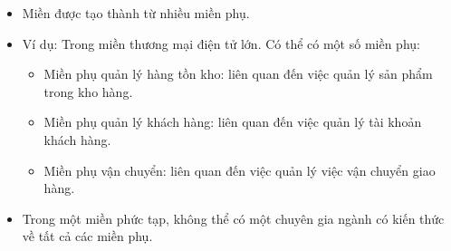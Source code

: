 \begin{itemize}

\item Miền được tạo thành từ nhiều miền phụ.

\item Ví dụ: Trong miền thương mại điện tử lớn. Có thể có một số miền phụ:

\begin{itemize}

\item Miền phụ quản lý hàng tồn kho: liên quan đến việc quản lý sản phẩm trong kho hàng.

\item Miền phụ quản lý khách hàng: liên quan đến việc quản lý tài khoản khách hàng.

\item Miền phụ vận chuyển: liên quan đến việc quản lý việc vận chuyển giao hàng.

\end{itemize}

\item Trong một miền phức tạp, không thể có một chuyên gia ngành có kiến thức về tất cả các miền phụ.

\end{itemize}